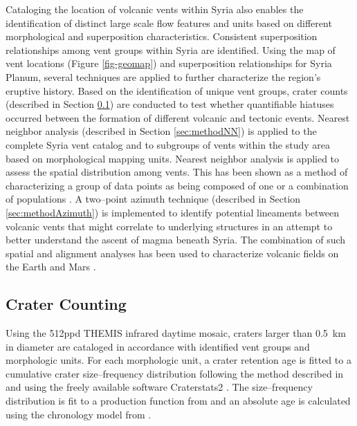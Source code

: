 Cataloging the location of volcanic vents within Syria also enables the identification of distinct large scale flow features and units based on different morphological and superposition characteristics.  Consistent superposition relationships among vent groups within Syria are identified. Using the map of vent locations (Figure \ref{fig-geomap}) and superposition relationships for Syria Planum, several techniques are applied to further characterize the region's eruptive history. Based on the identification of unique vent groups, crater counts (described in Section \ref{sec:methodCrater}) are conducted to test whether quantifiable hiatuses occurred between the formation of different volcanic and tectonic events. Nearest neighbor analysis (described in Section \ref{sec:methodNN}) is applied to the complete Syria vent catalog and to subgroups of vents within the study area based on morphological mapping units. Nearest neighbor analysis is applied to assess the spatial distribution among vents. This has been shown as a method of characterizing a group of data points as being composed of one or a combination of populations \citep{Bishop2007, Baloga2007}. A two--point azimuth technique (described in Section \ref{sec:methodAzimuth}) is implemented to identify potential lineaments between volcanic vents that might correlate to underlying structures \citep{Lutz1986,Wadge1988,Wadge1989,Connor1990,Lutz1995,Bleacher2009} in an attempt to better understand the ascent of magma beneath Syria. The combination of such spatial and alignment analyses has been used to characterize volcanic fields on the Earth \citep{Lutz1986,Lutz1995,Cebria2011,Roberts2011} and Mars \citep{Bleacher2009}.

\subsection{Crater Counting}
\label{sec:methodCrater}

Using the 512ppd THEMIS infrared daytime mosaic, craters larger than 0.5~km in diameter are cataloged in accordance with identified vent groups and morphologic units. For each morphologic unit, a crater retention age is fitted to a cumulative crater size--frequency distribution following the method described in \citet{Hartmann2005} and using the freely available software Craterstats2 \citep{Michael2010}. The size--frequency distribution is fit to a production function from \citet{Ivanov2001} and an absolute age is calculated using the chronology model from \citet{Hartmann2001}.

